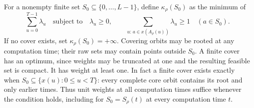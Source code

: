 \begin{definition}\label{def:fractional-core-cover}
For a nonempty finite set $S_0\subseteq\{0,\ldots,L-1\}$, define
$\kappa_\rho(S_0)$ as the minimum of
\[
 \sum_{u=0}^{T-1}\lambda_u
 \quad\text{subject to}\quad
 \lambda_u\ge0,\qquad
 \sum_{u:\,a\in x(A_\rho(u))}\lambda_u\ge1\quad(a\in S_0).
\]
If no cover exists, set $\kappa_\rho(S_0)=+\infty$.
Covering orbits may be rooted at any computation time; their raw sets
may contain points outside $S_0$. A finite cover has an optimum, since
weights may be truncated at one and the resulting feasible set is
compact. It has weight at least one. In fact a finite cover exists
exactly when $S_0\subseteq\{x(u):0\le u<T\}$: every complete core
orbit contains its root and only earlier times. Thus unit weights at
all computation times suffice whenever the condition holds, including
for $S_0=S_\rho(t)$ at every computation time $t$.
\end{definition}

